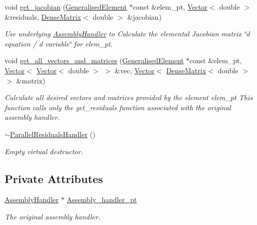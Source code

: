 \begin{DoxyCompactItemize}
void \hyperlink{classoomph_1_1ParallelResidualsHandler_a366186bb0905d7251390ec726fe33797}{get\+\_\+jacobian} (\hyperlink{classoomph_1_1GeneralisedElement}{Generalised\+Element} $\ast$const \&elem\+\_\+pt, \hyperlink{classoomph_1_1Vector}{Vector}$<$ double $>$ \&residuals, \hyperlink{classoomph_1_1DenseMatrix}{Dense\+Matrix}$<$ double $>$ \&jacobian)
\begin{DoxyCompactList}\small\item\em Use underlying \hyperlink{classoomph_1_1AssemblyHandler}{Assembly\+Handler} to Calculate the elemental Jacobian matrix \char`\"{}d equation 
/ d variable\char`\"{} for elem\+\_\+pt. \end{DoxyCompactList}\item 
void \hyperlink{classoomph_1_1ParallelResidualsHandler_adea071e3131e4e84b7c3e9400892fb17}{get\+\_\+all\+\_\+vectors\+\_\+and\+\_\+matrices} (\hyperlink{classoomph_1_1GeneralisedElement}{Generalised\+Element} $\ast$const \&elem\+\_\+pt, \hyperlink{classoomph_1_1Vector}{Vector}$<$ \hyperlink{classoomph_1_1Vector}{Vector}$<$ double $>$ $>$ \&vec, \hyperlink{classoomph_1_1Vector}{Vector}$<$ \hyperlink{classoomph_1_1DenseMatrix}{Dense\+Matrix}$<$ double $>$ $>$ \&matrix)
\begin{DoxyCompactList}\small\item\em Calculate all desired vectors and matrices provided by the element elem\+\_\+pt This function calls only the get\+\_\+residuals function associated with the original assembly handler. \end{DoxyCompactList}\item 
\hyperlink{classoomph_1_1ParallelResidualsHandler_abe905bb4dfc8977da144e8796f65ebf4}{$\sim$\+Parallel\+Residuals\+Handler} ()
\begin{DoxyCompactList}\small\item\em Empty virtual destructor. \end{DoxyCompactList}\end{DoxyCompactItemize}
\subsection*{Private Attributes}
\begin{DoxyCompactItemize}
\item 
\hyperlink{classoomph_1_1AssemblyHandler}{Assembly\+Handler} $\ast$ \hyperlink{classoomph_1_1ParallelResidualsHandler_a39fa02ec4efbb5f23df78a593d116672}{Assembly\+\_\+handler\+\_\+pt}
\begin{DoxyCompactList}\small\item\em The original assembly handler. \end{DoxyCompactList}\end{DoxyCompactItemize}



